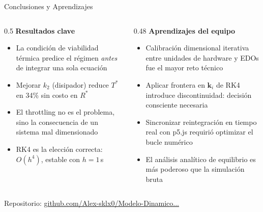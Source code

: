 \documentclass[aspectratio=169, 10pt]{beamer}
\begin{document}
\begin{frame}{Conclusiones y Aprendizajes}
  \begin{columns}[t]
    \begin{column}{0.5\textwidth}
      \textcolor{accent}{\small\textbf{Resultados clave}}
      \begin{itemize}\setlength\itemsep{4pt}
        \item La condición de viabilidad térmica predice el régimen
              \emph{antes} de integrar una sola ecuación
        \item Mejorar $k_2$ (disipador) reduce $T^*$ en 34\% sin costo en $R^*$
        \item El throttling no es el problema, sino la consecuencia
              de un sistema mal dimensionado
        \item RK4 es la elección correcta: $O(h^4)$, estable con $h=1$\,s
      \end{itemize}
    \end{column}
    \begin{column}{0.48\textwidth}
      \textcolor{accent}{\small\textbf{Aprendizajes del equipo}}
      \begin{itemize}\setlength\itemsep{4pt}
        \item Calibración dimensional iterativa entre unidades de
              hardware y EDOs fue el mayor reto técnico
        \item Aplicar frontera en $\mathbf{k}_i$ de RK4 introduce
              discontinuidad: decisión consciente necesaria
        \item Sincronizar reintegración en tiempo real con p5.js
              requirió optimizar el bucle numérico
        \item El análisis analítico de equilibrio es más poderoso
              que la simulación bruta
      \end{itemize}
    \end{column}
  \end{columns}
  \vspace{8pt}
  \scriptsize\textcolor{muted}{%
    Repositorio: \href{https://github.com/Alex-sklx0/Modelo-Dinamico-de-Estabilidad-Termica-y-Rendimiento-en-Computadores-de-Proposito-General}%
    {github.com/Alex-sklx0/Modelo-Dinamico...}}
\end{frame}
\end{document}
